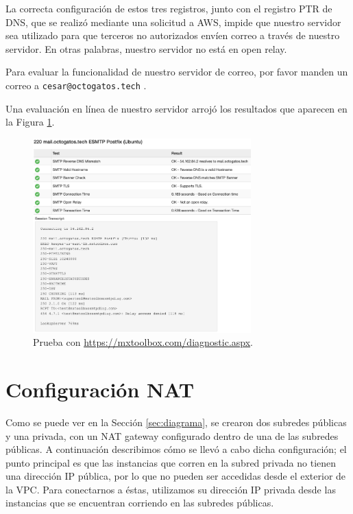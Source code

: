 \documentclass{article}
\newcommand{\ttt}[1]{%
\texttt{#1}%
}
\begin{document}
La correcta configuraci\'on de estos tres registros,
junto con el registro PTR de DNS, que se realiz\'o
mediante una solicitud a AWS, impide que nuestro
servidor sea utilizado para que terceros no autorizados
env\'ien correo a trav\'es de nuestro servidor.   En
otras palabras, nuestro servidor no est\'a en open relay.

Para evaluar la funcionalidad de nuestro servidor de
correo, por favor manden un correo a
\ttt{cesar@octogatos.tech}.

Una evaluaci\'on en l\'inea de nuestro servidor arroj\'o
los resultados que aparecen en la Figura \ref{fig:email-test}.

\begin{figure}[H]
  \centering
  \includegraphics[width=0.75\textwidth]{email/test}
  \caption{Prueba con \href{https://mxtoolbox.com/diagnostic.aspx}{https://mxtoolbox.com/diagnostic.aspx}.}
  \label{fig:email-test}
\end{figure}




\section{Configuraci\'on NAT}

Como se puede ver en la Secci\'on \ref{sec:diagrama},
se crearon dos subredes p\'ublicas y una privada, con
un NAT gateway configurado dentro de una de las subredes
p\'ublicas.   A continuaci\'on describimos c\'omo se
llev\'o a cabo dicha configuraci\'on; el punto
principal es que las instancias que corren en la subred
privada no tienen una direcci\'on IP p\'ublica, por lo
que no pueden ser accedidas desde el exterior de la VPC.
Para conectarnos a \'estas, utilizamos su direcci\'on
IP privada desde las instancias que se encuentran corriendo
en las subredes p\'ublicas.
\end{document}
